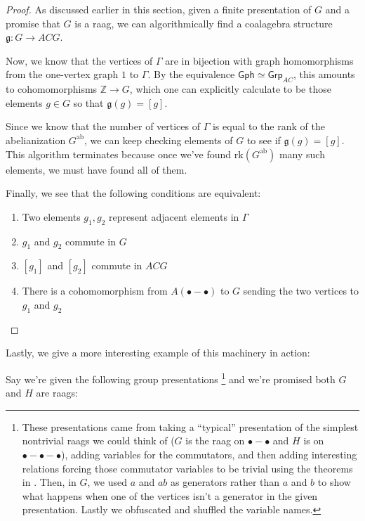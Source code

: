\documentclass[12pt]{article}
\theoremstyle{definition}
\theoremstyle{theorem}
\newcommand*{\catFont}[1]{\mathsf{#1}}
\newcommand{\Grp}{\catFont{Grp}}
\begin{document}
\begin{proof}
  As discussed earlier in this section, given a finite presentation of $G$ 
  and a promise that $G$ is a raag, we can algorithmically find a coalagebra 
  structure $\mathfrak{g} : G \to ACG$.

  Now, we know that the vertices of $\Gamma$ are in bijection with 
  graph homomorphisms from the one-vertex graph $1$ to $\Gamma$. 
  By the equivalence $\mathsf{Gph} \simeq \Grp_{AC}$, this amounts 
  to cohomomorphisms $\mathbb{Z} \to G$, which one can explicitly 
  calculate to be those elements $g \in G$ so that $\mathfrak{g}(g) = [g]$.

  Since we know that the number of vertices of $\Gamma$ is equal to the 
  rank of the abelianization $G^\text{ab}$, we can keep checking elements 
  of $G$ to see if $\mathfrak{g}(g) = [g]$. This algorithm terminates 
  because once we've found $\text{rk}(G^\text{ab})$ many such elements, 
  we must have found all of them.

  Finally, we see that the following conditions are equivalent:
  \begin{enumerate}
    \item Two elements $g_1, g_2$ represent adjacent elements in $\Gamma$ 
    \item $g_1$ and $g_2$ commute in $G$
    \item $[g_1]$ and $[g_2]$ commute in $ACG$
    \item There is a cohomomorphism from $A(\bullet - \bullet)$ to $G$ 
      sending the two vertices to $g_1$ and $g_2$
  \end{enumerate}
\end{proof}

\bigskip

Lastly, we give a more interesting example of this machinery in action:

Say we're given the following group presentations%
\footnote{These presentations came from taking a ``typical'' 
presentation of the simplest nontrivial raags we could think of 
($G$ is the raag on $\bullet - \bullet$ and $H$ is on 
$\bullet - \bullet - \bullet$), adding variables for 
the commutators, and then adding interesting relations forcing those 
commutator variables to be trivial using the theorems in 
\cite{millerPresentationsTrivialGroup1999}. Then, in $G$, 
we used $a$ and $ab$ as generators rather than $a$ and $b$ to show 
what happens when one of the vertices isn't a generator in the given 
presentation. Lastly we obfuscated and shuffled the variable names.
}
and we're promised both $G$ and $H$ are raags:
\end{document}
